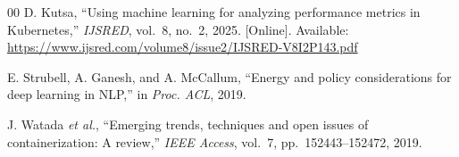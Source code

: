 \documentclass{ieeeaccess}
\begin{document}
\begin{thebibliography}{00}
D. Kutsa, ``Using machine learning for analyzing performance metrics in Kubernetes,'' \textit{IJSRED}, vol.~8, no.~2, 2025. [Online]. Available: \url{https://www.ijsred.com/volume8/issue2/IJSRED-V8I2P143.pdf}

E. Strubell, A. Ganesh, and A. McCallum, ``Energy and policy considerations for deep learning in NLP,'' in \textit{Proc. ACL}, 2019.

J. Watada \textit{et al.}, ``Emerging trends, techniques and open issues of containerization: A review,'' \textit{IEEE Access}, vol.~7, pp.~152443--152472, 2019.
 
\end{thebibliography} 
\EOD
\end{document}
